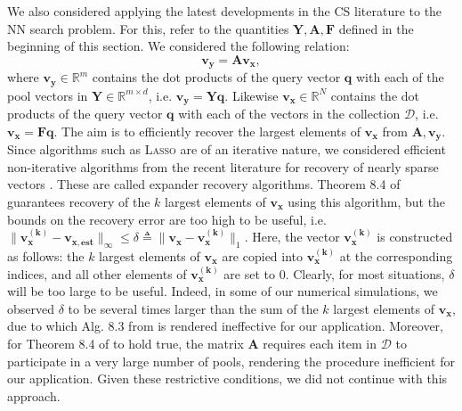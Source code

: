 \documentclass[sigconf, anonymous, review]{acmart}
\begin{document}
We also considered applying the latest developments in the CS literature to the NN search problem. For this, refer to the quantities $\boldsymbol{Y}, \boldsymbol{A}, \boldsymbol{F}$ defined in the beginning of this section. We considered the following relation:
\begin{equation}
\boldsymbol{v_y} = \boldsymbol{A v_x},
\end{equation}
where $\boldsymbol{v_y} \in \mathbb{R}^m$ contains the dot products of the query vector $\boldsymbol{q}$ with each of the pool vectors in $\boldsymbol{Y} \in \mathbb{R}^{m \times d}$, i.e. $\boldsymbol{v_y} = \boldsymbol{Yq}$. Likewise $\boldsymbol{v_x} \in \mathbb{R}^N$ contains the dot products of the query vector $\boldsymbol{q}$ with each of the vectors in the collection $\mathcal{D}$, i.e. $\boldsymbol{v_x} = \boldsymbol{Fq}$. The aim is to efficiently recover the largest elements of $\boldsymbol{v_x}$ from $\boldsymbol{A}, \boldsymbol{v_y}$. Since algorithms such as \textsc{Lasso} are of an iterative nature, we considered efficient non-iterative algorithms from the recent literature for recovery of nearly sparse vectors \cite[Alg. 8.3]{Vidyasagar2019}. These are called expander recovery algorithms. Theorem 8.4 of \cite{Vidyasagar2019} guarantees recovery of the $k$ largest elements of $\boldsymbol{v_x}$ using this algorithm, but the bounds on the recovery error are too high to be useful, i.e. $\|\boldsymbol{v^{(k)}_x}-\boldsymbol{v_{x,est}}\|_{\infty} \leq \delta \triangleq \|\boldsymbol{v_x}-\boldsymbol{v^{(k)}_x}\|_1$. Here, the vector $\boldsymbol{v^{(k)}_x}$ is constructed as follows: the $k$ largest elements of $\boldsymbol{v_x}$ are copied into $\boldsymbol{v^{(k)}_x}$ at the corresponding indices, and all other elements of $\boldsymbol{v^{(k)}_x}$ are set to 0. Clearly, for most situations, $\delta$ will be too large to be useful. Indeed, in some of our numerical simulations, we observed $\delta$ to be several times larger than the sum of the $k$ largest elements of $\boldsymbol{v_x}$, due to which Alg. 8.3 from \cite{Vidyasagar2019} is rendered ineffective for our application. Moreover, for Theorem 8.4 of \cite{Vidyasagar2019} to hold true, the matrix $\boldsymbol{A}$ requires each item in $\mathcal{D}$ to participate in a very large number of pools, rendering the procedure inefficient for our application. Given these restrictive conditions, we did not continue with this approach. 
\end{document}
